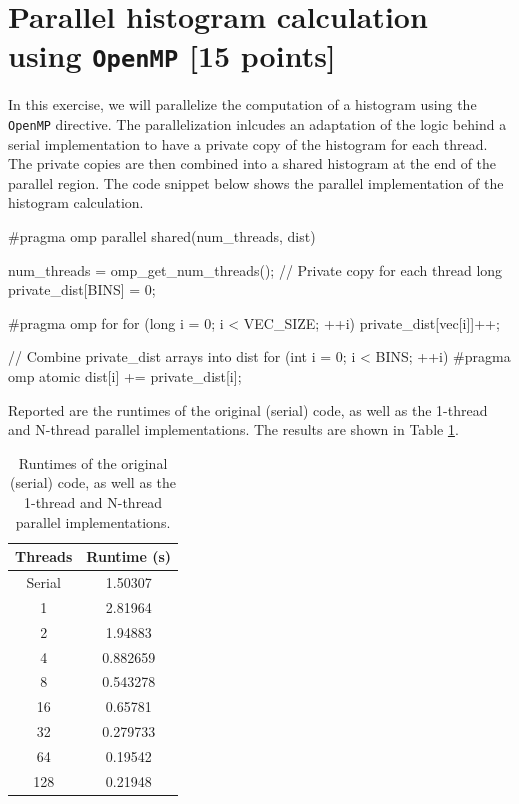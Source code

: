 \documentclass[unicode,11pt,a4paper,oneside,numbers=endperiod,openany]{scrartcl}
\begin{document}
\section{Parallel histogram calculation using \texttt{OpenMP} [15 points]}
In this exercise, we will parallelize the computation of a histogram using the
\texttt{OpenMP} directive. The parallelization inlcudes an adaptation of the
logic behind a serial implementation to have a private copy of the histogram for
each thread. The private copies are then combined into a shared histogram at the
end of the parallel region. The code snippet below shows the parallel
implementation of the histogram calculation.
\begin{cppverbatim}
#pragma omp parallel shared(num_threads, dist)
{
  num_threads = omp_get_num_threads();
  // Private copy for each thread
  long private_dist[BINS] = {0}; 

#pragma omp for
  for (long i = 0; i < VEC_SIZE; ++i)
  {
    private_dist[vec[i]]++;
  }

  // Combine private_dist arrays into dist
  for (int i = 0; i < BINS; ++i)
  {
#pragma omp atomic
    dist[i] += private_dist[i];
  }
}
\end{cppverbatim}
Reported are the runtimes of the original (serial) code, as well as the 1-thread
and N-thread parallel implementations. The results are shown in Table
\ref{tab:histogram-runtimes}.
\begin{table}[htbp]
  \centering
  \begin{tabular}{|c|c|}
  \hline
   Threads & Runtime (s)\\
  \hline
  Serial & 1.50307 \\
   1 & 2.81964 \\
   2 & 1.94883 \\
   4 & 0.882659 \\
   8 & 0.543278 \\
   16 & 0.65781 \\
   32 & 0.279733 \\
   64 & 0.19542 \\
   128 & 0.21948 \\
  \hline
  \end{tabular}
  \caption{Runtimes of the original (serial) code, as well as the 1-thread and N-thread parallel implementations.}
  \label{tab:histogram-runtimes}
\end{table}
\end{document}
